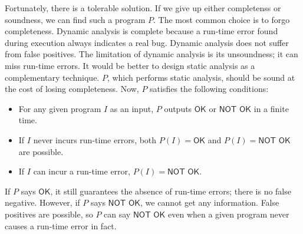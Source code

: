 



Fortunately, there is a tolerable solution. If we give up either completenss or
soundness, we can find such a program $P$. The most common choice is to forgo
completeness. Dynamic analysis is complete because a run-time error found
during execution always indicates a real bug. Dynamic analysis does not suffer
from false positives. The limitation of dynamic analysis is its unsoundness; it
can miss run-time errors. It would be better to design static analysis as a
complementary technique. $P$, which performs static analysis, should be sound at
the cost of losing completeness. Now, $P$ satisfies the following conditions:
\begin{itemize}
  \item For any given program $I$ as an input, $P$ outputs $\textsf{OK}$ or
    $\textsf{NOT OK}$ in a finite time.
  \item If $I$ never incurs run-time errors,
    both $P(I)=\textsf{OK}$ and $P(I)=\textsf{NOT OK}$ are possible.
  \item If $I$ can incur a run-time error, $P(I)=\textsf{NOT OK}$.
\end{itemize}
If $P$ says $\textsf{OK}$, it still guarantees the absence of run-time errors;
there is no false negative. However, if $P$ says $\textsf{NOT OK}$, we cannot
get any information. False positives are possible, so $P$ can say $\textsf{NOT
OK}$ even when a given program never causes a run-time error in fact.


